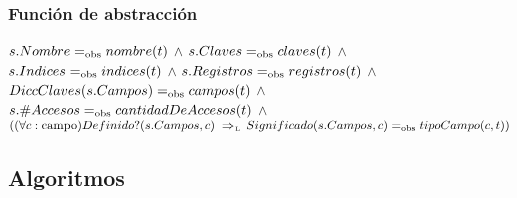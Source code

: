 
\subsubsection*{Función de abstracción}
$s.Nombre =_{\mathrm{obs}} nombre(t)$ $\land$ $s.Claves =_{\mathrm{obs}} claves(t)$ $\land$ \\
$s.Indices =_{\mathrm{obs}} indices(t)$ $\land$ 
$s.Registros =_{\mathrm{obs}} registros(t)$ $\land$ 
$DiccClaves(s.Campos) =_{\mathrm{obs}} campos(t)$ $\land$ 
$s.\#Accesos =_{\mathrm{obs}} cantidadDeAccesos(t)$ $\land$ \\
$((\paratodo{campo}{c}) Definido?(s.Campos, c) \impluego Significado(s.Campos, c) \igobs tipoCampo(c, t))$ \\

\newpage

\subsection{Algoritmos}


